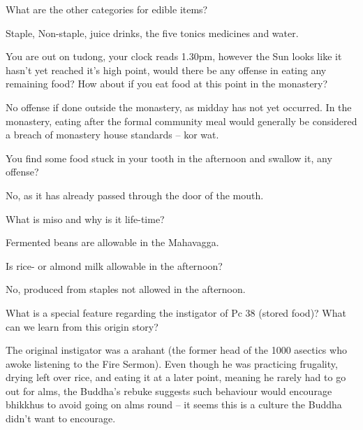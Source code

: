 \bigskip

What are the other categories for edible items?

\begin{solution}
  Staple, Non-staple, juice drinks, the five tonics medicines and water.
\end{solution}

\bigskip

You are out on tudong, your clock reads 1.30pm, however the Sun looks like it
hasn't yet reached it's high point, would there be any offense in eating any
remaining food? How about if you eat food at this point in the monastery?

\begin{solution}
  No offense if done outside the monastery, as midday has not yet occurred. In
  the monastery, eating after the formal community meal would generally be
  considered a breach of monastery house standards – kor wat.
\end{solution}

\bigskip

You find some food stuck in your tooth in the afternoon and swallow it, any offense?

\begin{solution}
  No, as it has already passed through the door of the mouth.
\end{solution}

\bigskip

What is miso and why is it life-time?

\begin{solution}
  Fermented beans are allowable in the Mahavagga.
\end{solution}

\bigskip

Is rice- or almond milk allowable in the afternoon?

\begin{solution}
  No, produced from staples not allowed in the afternoon.
\end{solution}

\bigskip


What is a special feature regarding the instigator of Pc 38 (stored food)? What
can we learn from this origin story?

\begin{solution}
  The original instigator was a arahant (the former head of the 1000 asectics
  who awoke listening to the Fire Sermon). Even though he was practicing
  frugality, drying left over rice, and eating it at a later point, meaning he
  rarely had to go out for alms, the Buddha’s rebuke suggests such behaviour
  would encourage bhikkhus to avoid going on alms round – it seems this is a
  culture the Buddha didn’t want to encourage.
\end{solution}


